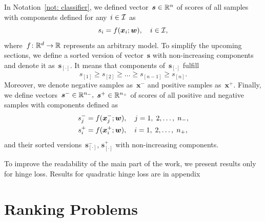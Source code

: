\begin{notation}\label{not: scores}
  In Notation~\ref{not: classifier}, we defined vector~$\bm{s} \in \mathbb{R}^n$ of scores of all samples with components defined for any~$i \in \mathcal{I}$ as
  \begin{equation*}
    s_i = f(\bm{x}_i; \bm{w}), \quad i \in \mathcal{I},
  \end{equation*}
  where~$f \colon \mathbb{R}^d \to \mathbb{R}$ represents an arbitrary model. To simplify the upcoming sections, we define a sorted version of vector~$\bm{s}$ with non-increasing components and denote it as~$\bm{s}_{[\cdot]}.$ It means that components of~$\bm{s}_{[\cdot]}$ fulfill
  \begin{equation*}
    s_{[1]}   \geq s_{[2]} \geq \dots \geq s_{[n - 1]} \geq s_{[n]}.
  \end{equation*}
  Moreover, we denote negative samples as~$\bm{x}^-$ and positive samples as~$\bm{x}^+.$ Finally, we define vectors~$\bm{s}^- \in \mathbb{R}^{n_{-}},$ $\bm{s}^+ \in \mathbb{R}^{n_{+}}$ of scores of all positive and negative samples with components defined as
  \begin{equation*}
    \begin{aligned}
      s^-_j & = f(\bm{x}^-_j; \bm{w}), \quad j = 1, \; 2, \ldots, \; n_{-}, \\
      s^+_i & = f(\bm{x}^+_i; \bm{w}), \quad i = 1, \; 2, \ldots, \; n_{+},
    \end{aligned}
  \end{equation*}
  and their sorted versions~$\bm{s}^-_{[\cdot]}$, $\bm{s}^+_{[\cdot]}$ with non-increasing components.
\end{notation}

\begin{note}
  To improve the readability of the main part of the work, we present results only for hinge loss. Results for quadratic hinge loss are in appendix
\end{note}

\section{Ranking Problems}\label{sec: ranking}

